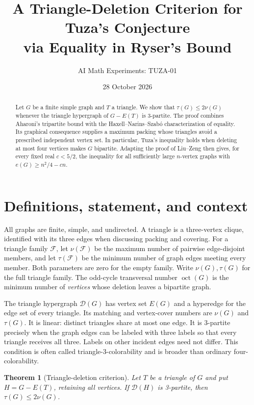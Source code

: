 \documentclass[11pt]{article}
\title{A Triangle-Deletion Criterion for Tuza's Conjecture\\via Equality in Ryser's Bound}
\author{AI Math Experiments: TUZA-01}
\date{28 October 2026}
\newtheorem{theorem}{Theorem}[section]
\newcommand{\D}{\mathcal D}
\newcommand{\oct}{\operatorname{oct}}
\begin{document}
\maketitle
\begin{abstract}
Let $G$ be a finite simple graph and $T$ a triangle. We show that
$\tau(G)\le2\nu(G)$ whenever the triangle hypergraph of $G-E(T)$ is
3-partite. The proof combines Aharoni's tripartite bound with the
Haxell--Narins--Szab\'o characterization of equality. Its graphical
consequence supplies a maximum packing whose triangles avoid a prescribed
independent vertex set. In particular, Tuza's inequality holds when deleting
at most four vertices makes $G$ bipartite. Adapting the proof of Liu--Zeng
then gives, for every fixed real $c<5/2$, the inequality for all sufficiently
large $n$-vertex graphs with $e(G)\ge n^2/4-cn$.
\end{abstract}

\section{Definitions, statement, and context}
All graphs are finite, simple, and undirected. A triangle is a three-vertex
clique, identified with its three edges when discussing packing and covering.
For a triangle family $\mathcal F$, let $\nu(\mathcal F)$ be the maximum
number of pairwise edge-disjoint members, and let $\tau(\mathcal F)$ be the
minimum number of graph edges meeting every member. Both parameters are zero
for the empty family. Write $\nu(G),\tau(G)$ for the full triangle family.
The odd-cycle transversal number $\oct(G)$ is the minimum number of
\emph{vertices} whose deletion leaves a bipartite graph.

The triangle hypergraph $\D(G)$ has vertex set $E(G)$ and a hyperedge for
the edge set of every triangle. Its matching and vertex-cover numbers are
$\nu(G)$ and $\tau(G)$. It is linear: distinct triangles share at most one
edge. It is 3-partite precisely when the graph edges can be labeled with
three labels so that every triangle receives all three. Labels on other
incident edges need not differ. This condition is often called
triangle-3-colorability and is broader than ordinary four-colorability.

\begin{theorem}[Triangle-deletion criterion]\label{thm:main}
Let $T$ be a triangle of $G$ and put $H=G-E(T)$, retaining all vertices.
If $\D(H)$ is 3-partite, then $\tau(G)\le2\nu(G)$.
\end{theorem}
\end{document}
